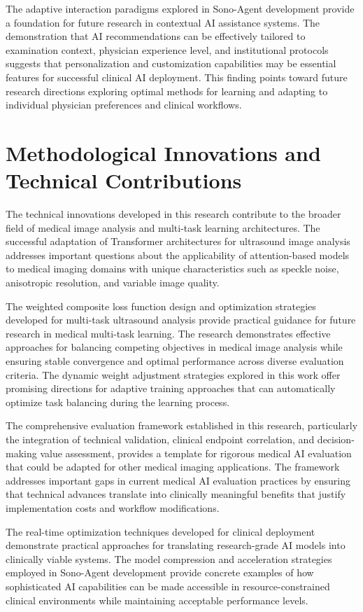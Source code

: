 The adaptive interaction paradigms explored in Sono-Agent development provide a foundation for future research in contextual AI assistance systems. The demonstration that AI recommendations can be effectively tailored to examination context, physician experience level, and institutional protocols suggests that personalization and customization capabilities may be essential features for successful clinical AI deployment. This finding points toward future research directions exploring optimal methods for learning and adapting to individual physician preferences and clinical workflows.

\section{Methodological Innovations and Technical Contributions}

The technical innovations developed in this research contribute to the broader field of medical image analysis and multi-task learning architectures. The successful adaptation of Transformer architectures for ultrasound image analysis addresses important questions about the applicability of attention-based models to medical imaging domains with unique characteristics such as speckle noise, anisotropic resolution, and variable image quality.

The weighted composite loss function design and optimization strategies developed for multi-task ultrasound analysis provide practical guidance for future research in medical multi-task learning. The research demonstrates effective approaches for balancing competing objectives in medical image analysis while ensuring stable convergence and optimal performance across diverse evaluation criteria. The dynamic weight adjustment strategies explored in this work offer promising directions for adaptive training approaches that can automatically optimize task balancing during the learning process.

The comprehensive evaluation framework established in this research, particularly the integration of technical validation, clinical endpoint correlation, and decision-making value assessment, provides a template for rigorous medical AI evaluation that could be adapted for other medical imaging applications. The framework addresses important gaps in current medical AI evaluation practices by ensuring that technical advances translate into clinically meaningful benefits that justify implementation costs and workflow modifications.

The real-time optimization techniques developed for clinical deployment demonstrate practical approaches for translating research-grade AI models into clinically viable systems. The model compression and acceleration strategies employed in Sono-Agent development provide concrete examples of how sophisticated AI capabilities can be made accessible in resource-constrained clinical environments while maintaining acceptable performance levels.

